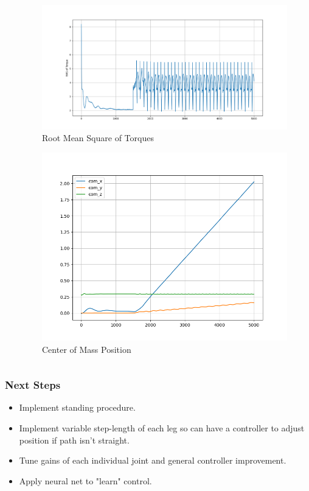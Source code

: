 \documentclass{beamer}
\begin{document}
\begin{frame}
\begin{columns}[onlytextwidth, T]
\begin{column}{.5\textwidth}
        \end{column}
        \begin{column}{.5\textwidth}
            \begin{figure}
                \includegraphics[width=\textwidth]{../images/rms.png}
                \caption[font=tiny]{Root Mean Square of Torques}
            \end{figure}
            \vspace{-0.9cm}
            \begin{figure}
                \includegraphics[height=0.4\textheight]{../images/w_com.png}
                \caption{Center of Mass Position}
            \end{figure}
        \end{column}
      \end{columns}
\end{frame}
\begin{frame}
    \frametitle{Next Steps}
    \begin{itemize}
      \item Implement standing procedure.
      \item Implement variable step-length of each leg so can have a controller to adjust
      position if path isn't straight.
      \item Tune gains of each individual joint and general controller improvement. 
      \item Apply neural net to "learn" control. 
    \end{itemize}
  \end{frame}
\end{document}
